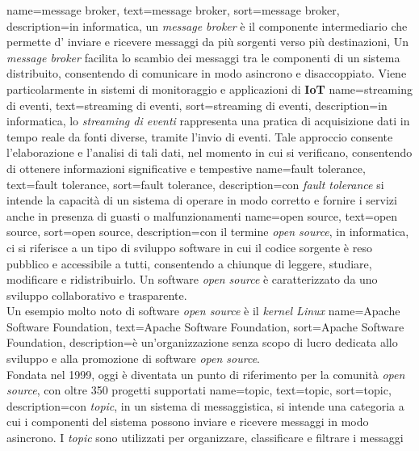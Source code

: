{
    name={message broker},
    text=message broker,
    sort=message broker,
    description={in informatica, un \textit{message broker} è  il componente intermediario che permette d' inviare e ricevere messaggi da più sorgenti verso più destinazioni,
    Un \textit{message broker} facilita lo scambio dei messaggi 
    tra le componenti di un sistema distribuito, consentendo di comunicare in modo asincrono e disaccoppiato.
    Viene particolarmente in sistemi di monitoraggio e applicazioni di \textbf{IoT}}
}
{
    name={streaming di eventi},
    text=streaming di eventi,
    sort=streaming di eventi,
    description={in informatica, lo \textit{streaming di eventi} rappresenta una pratica di acquisizione dati in tempo reale da fonti diverse, 
    tramite l'invio di eventi. Tale approccio consente l'elaborazione e l'analisi di tali dati, nel momento in cui si verificano,
    consentendo di ottenere informazioni significative e tempestive}
}
{
    name={fault tolerance},
    text=fault tolerance,
    sort=fault tolerance,
    description={con \textit{fault tolerance} si intende la capacità di un sistema di operare in modo corretto e fornire 
    i servizi anche in presenza di guasti o malfunzionamenti}
}
{
    name={open source},
    text=open source,
    sort=open source,
    description={con il termine \textit{open source}, in informatica, ci si riferisce a un tipo di sviluppo software in cui il codice sorgente è reso pubblico e accessibile a tutti,
    consentendo a chiunque di leggere, studiare, modificare e ridistribuirlo.
    Un software \textit{open source} è caratterizzato da uno sviluppo collaborativo e trasparente.\\
    Un esempio molto noto di software \textit{open source} è il \textit{kernel Linux}}
}
{
    name={Apache Software Foundation},
    text=Apache Software Foundation,
    sort=Apache Software Foundation,
    description={è un'organizzazione senza scopo di lucro dedicata allo sviluppo e alla promozione di software \textit{open source}.\\
    Fondata nel 1999, oggi è diventata un punto di riferimento per la comunità \textit{open source}, con oltre 350 progetti supportati}
}
{
    name={topic},
    text=topic,
    sort=topic,
    description={con \textit{topic}, in un sistema di messaggistica, si intende una categoria a cui i componenti del sistema possono inviare e 
    ricevere messaggi in modo asincrono. I \textit{topic} sono utilizzati per organizzare, classificare e filtrare i messaggi}
}
